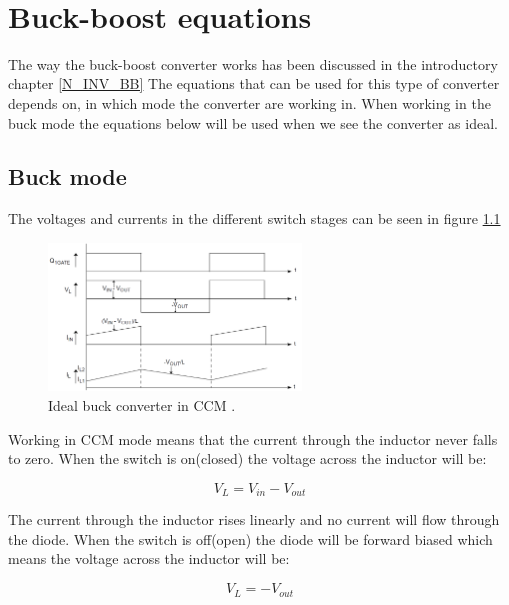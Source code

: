 \\
\chapter{Buck-boost equations}\label{ch:Appbuckboost}

The way the buck-boost converter works has been discussed in the introductory chapter \ref{N_INV_BB} The equations that can be used for this type of converter depends on, in which mode the converter are working in. When working in the buck mode the equations below will be used when we see the converter as ideal. 

\section{Buck mode}

The voltages and currents in the different switch stages can be seen in figure \ref{CCM_buck}

\begin{figure}[htbp]
	\begin{center}
		\includegraphics[width=0.6\textwidth]{../Pictures/P1/Appendix/buck_currents}
		\caption{Ideal buck converter in CCM \cite{AN1114_MC}.}
		\label{CCM_buck}
	\end{center}	
\end{figure}

Working in CCM mode means that the current through the inductor never falls to zero. When the switch is on(closed) the voltage across the inductor will be: 

\begin{equation}
V_L = V_{in}-V_{out}
\end{equation} 

The current through the inductor rises linearly and no current will flow through the diode.
When the switch is off(open) the diode will be forward biased which means the voltage across the inductor will be:

\begin{equation}
V_L = -V_{out}
\end{equation} 

